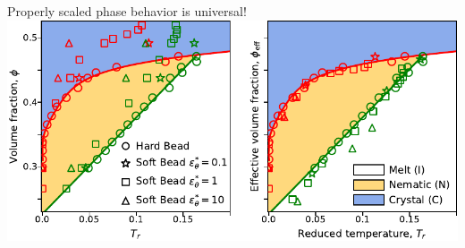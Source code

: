 \documentclass[aspectratio=169]{beamer}
\begin{document}
\begin{frame}[c]{Properly scaled phase behavior is universal!}
  \centering
  \vspace{\baselineskip}
  \includegraphics{../figures/fig-phase_diag_corr/fig-phase_diag_corr.pdf}
\end{frame}
\end{document}
